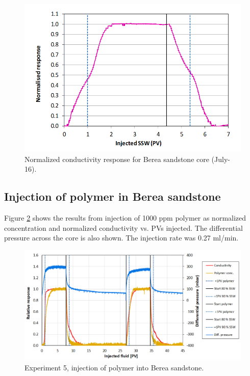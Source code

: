 \begin{figure}[p]
    \centering
    \includegraphics[width=\textwidth]{img/cht/CondBerNorm.png}
    \caption{Normalized conductivity response for Berea sandstone core (July-16).}
    \label{cht:CondBerNorm}
\end{figure}

\subsection{Injection of polymer in Berea sandstone}
Figure \ref{cht:injexp5ber1} shows the results from injection of 1000 ppm polymer as normalized concentration and normalized conductivity vs. PVs injected. The differential pressure across the core is also shown. The injection rate was 0.27 ml/min.

\begin{figure}[p]
    \centering
    \includegraphics[width=\textwidth]{img/cht/injexp5ber1.png}
    \caption{Experiment 5, injection of polymer into Berea sandstone.}
    \label{cht:injexp5ber1}
\end{figure}

